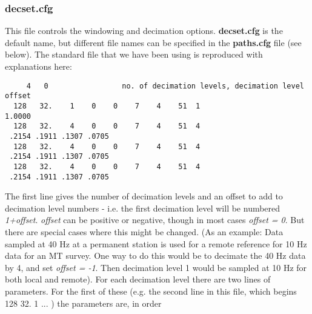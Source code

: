 \subsubsection{decset.cfg} 

This file
controls the windowing and decimation options.
{\bf decset.cfg} is the default name, but different file names
can be specified in the {\bf paths.cfg} file (see below).
The standard
file that we have been using is reproduced with explanations here:
\small

\begin{verbatim}
     4   0                 no. of decimation levels, decimation level offset
  128   32.    1    0    0    7    4    51  1
1.0000 
  128   32.    4    0    0    7    4    51  4
 .2154 .1911 .1307 .0705
  128   32.    4    0    0    7    4    51  4
 .2154 .1911 .1307 .0705
  128   32.    4    0    0    7    4    51  4
 .2154 .1911 .1307 .0705
\end{verbatim}
\normalsize

The first line gives the number of decimation levels and an offset to add
to decimation level numbers - i.e. the first decimation level will be numbered
{\it 1+offset}.  {\it offset} can be positive 
or negative, though in most cases
{\it offset = 0}.  But there are special cases where this might be changed.
(As an example: Data sampled at 40 Hz at a permanent station is used for
a remote reference for 10 Hz data for an MT survey.  One way to do this
would be to decimate the 40 Hz data by 4, and set {\it offset = -1}.
Then decimation level 1 would be sampled at 10 Hz for both local and remote).
For each decimation level there are two lines of parameters.
For the first of these (e.g. the second line in this file, which begins
128 32. 1 ...    ) the parameters are, in order

